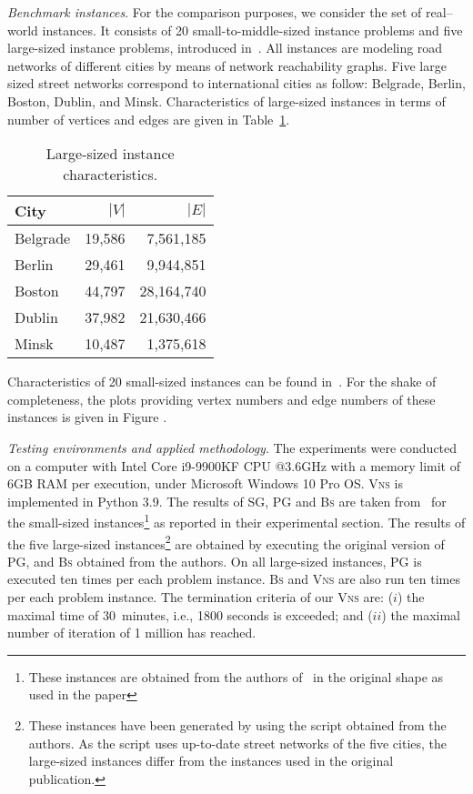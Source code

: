 \documentclass[dvipsnames,format=sigconf,anonymous=true,review=true]{acmart}
\begin{document}
\emph{Benchmark instances}. For the comparison purposes, we consider the set of real--world instances. It consists of 20 small-to-middle-sized instance problems and five large-sized instance problems, introduced in~\cite{corcoran2021heuristics}. All instances are  modeling road networks of different cities by means of network reachability graphs. Five large sized street networks correspond to international cities as follow: Belgrade, Berlin, Boston, Dublin, and Minsk.
 Characteristics of large-sized instances in terms of number of vertices and edges are given in Table~\ref{tab:big_instances_chars}. 
 
 \begin{table}
 	\caption{Large-sized instance characteristics.}
 	\label{tab:big_instances_chars}  
 	\begin{tabular}{lrr}
 		City      & $|V|$ & $|E|$ \\ \hline
 		Belgrade      & 19,586 & 7,561,185  \\ 
 		Berlin        & 29,461 & 9,944,851 \\
 	    Boston        & 44,797 & 28,164,740 \\
 	    Dublin        & 37,982 & 21,630,466 \\
 	    Minsk         & 10,487 & 1,375,618 \\ \hline
 	\end{tabular}
 \end{table}
 
 Characteristics of 20 small-sized instances can be found in~\cite{corcoran2021heuristics}. For the shake of completeness, the plots providing vertex numbers and edge numbers of these instances is given in Figure .  
 
 
 \emph{Testing environments and applied methodology}. The experiments were conducted  on a computer with Intel Core i9-9900KF CPU @3.6GHz with a memory limit of 6GB RAM per execution, under Microsoft Windows 10 Pro OS. \textsc{Vns}  is implemented in Python 3.9. The results of \textsc{SG}, \textsc{PG} and \textsc{Bs} are taken from~\cite{corcoran2021heuristics} for the small-sized instances\footnote{These instances are obtained from the authors of~\cite{corcoran2021heuristics} in the original shape as used in the paper} as reported in their experimental section. The results of the  five large-sized instances\footnote{These instances have been generated by using the script obtained from the authors. As the script uses up-to-date street networks of the five cities, the large-sized instances differ from the instances used in the original publication. } are obtained by executing the original version of \textsc{PG}, and \textsc{Bs} obtained from the authors. On all large-sized instances,  \textsc{PG} is executed ten times per each problem instance. \textsc{Bs} and \textsc{Vns} are also run ten times per each problem instance.  The termination criteria of our \textsc{Vns} are: ($i$) the maximal time of 30~minutes, i.e., 1800 seconds is exceeded; and ($ii$) the maximal number of iteration of 1 million has reached. 
\end{document}
